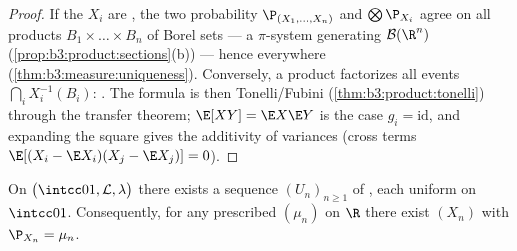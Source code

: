 \begin{proof}
If the $X_i$ are , the two probability 
$\P_{(X_1,\dots,X_n)}$ and $\bigotimes\P_{X_i}$ agree on all
products $B_1\times\dots\times B_n$ of Borel sets --- a
$\pi$-system generating $\mathcal B(\R^n)$
(\cref{prop:b3:product:sections}(b)) --- hence everywhere
(\cref{thm:b3:measure:uniqueness}). Conversely, a product 
factorizes all events $\bigcap_iX_i^{-1}(B_i)$: . The  formula is then
Tonelli/Fubini (\cref{thm:b3:product:tonelli}) through the
transfer theorem; $\E[XY] = \E X\E Y$ is the case $g_i =
\mathrm{id}$, and expanding the square gives the additivity
of variances (cross terms $\E[(X_i - \E X_i)(X_j - \E X_j)]
= 0$).
\end{proof}

\begin{theorem}
\label{thm:b3:probability:existence}
On $\bigl(\intcc01, \mathcal L, \lambda\bigr)$ there exists a
sequence $(U_n)_{n\geq1}$ of  ,
each uniform on $\intcc01$. Consequently, for any prescribed
 $(\mu_n)$ on $\R$ there exist  $(X_n)$ with
$\P_{X_n} = \mu_n$.
\end{theorem}

